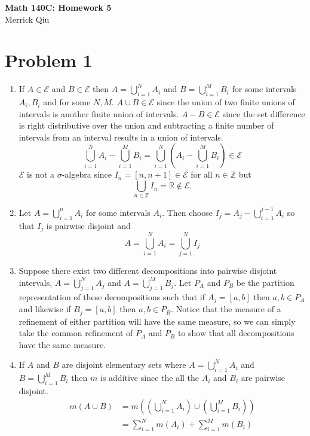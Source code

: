 \documentclass{article}
\begin{document}
\begin{center}
	\huge{\bf Math 140C: Homework 5} \\
	Merrick Qiu
\end{center}

\section*{Problem 1}
\begin{enumerate}
  \item If $A\in\mathcal{E}$ and $B\in\mathcal{E}$ 
  then $A = \bigcup_{i=1}^N A_i$ and $B = \bigcup_{i=1}^M B_i$ for 
  some intervals $A_i, B_i$ and for some $N,M$.
  $A\cup B\in\mathcal{E}$ since
  the union of two finite unions of intervals is another finite union of intervals.
  $A-B\in\mathcal{E}$ since the set 
  difference is right distributive over the union and
  subtracting a finite number of intervals from an interval results in a union of intervals.
  \[
    \bigcup_{i=1}^N A_i - \bigcup_{i=1}^M B_i = 
    \bigcup_{i=1}^N \left(A_i - \bigcup_{i=1}^M B_i\right)
    \in \mathcal{E}
  \]
  $\mathcal{E}$ is not a $\sigma$-algebra since $I_n = [n, n+1] \in \mathcal{E}$
  for all $n \in \mathbb{Z}$ but 
  \[
    \bigcup_{n\in \mathbb{Z}} I_n = \mathbb{R} \notin \mathcal{E}.
  \]
  \item Let $A = \bigcup_{i=1}^n A_i$ for some intervals $A_i$.
  Then choose $I_j = A_j - \bigcup_{i=1}^{j-1} A_i$ so that $I_j$ is pairwise disjoint
  and 
  \[
    A = \bigcup_{i=1}^N A_i = \bigcup_{j=1}^N I_j
  \]
  \item Suppose there exist two different decompositions into pairwise disjoint intervals, 
  $A = \bigcup_{j=1}^N A_j$ and $A = \bigcup_{j=1}^M B_j$.
  Let $P_A$ and $P_B$ be the partition representation of these decompositions
  such that if $A_j = [a,b]$ then $a,b \in P_A$ and likewise if
  $B_j = [a,b]$ then $a,b \in P_B$.
  Notice that the measure of a refinement of either partition will have the same measure,
  so we can simply take the common refinement of $P_A$ and $P_B$ to show that
  all decompositions have the same measure.
  \item 
  If $A$ and $B$ are disjoint elementary sets where $A = \bigcup_{i=1}^N A_i$ and $B = \bigcup_{i=1}^M B_i$ then 
  $m$ is additive since the all the $A_i$ and $B_i$ are pairwise disjoint.
  \begin{align*}
    m(A \cup B) &= m\left(\left(\bigcup_{i=1}^N A_i\right) \cup\left(\bigcup_{i=1}^M B_i\right)\right) \\
    &= \sum_{i=1}^N m(A_i) + \sum_{i=1}^M m(B_i)
  \end{align*}
\end{enumerate}
\newpage
\end{document}
